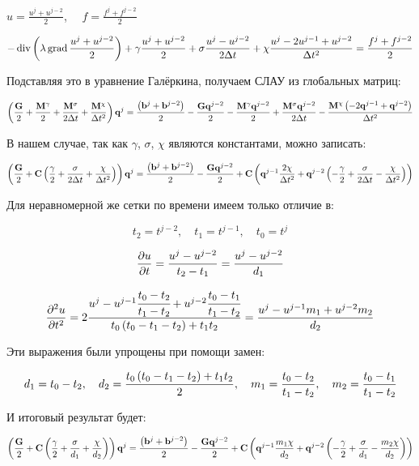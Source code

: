 \begin{center}
$\displaystyle u = \frac{u^j+u^{j-2}}{2} $, $\displaystyle \quad f = \frac{f^j+f^{j-2}}{2} $
\end{center}

\begin{center}
$\displaystyle -\operatorname{div}\left(\lambda \operatorname{grad}\frac{u^j+u^{j-2}}{2}\right) + \gamma \frac{u^j+u^{j-2}}{2} + \sigma \frac{u^j - u^{j-2}}{2\Delta t} + \chi \frac{u^j-2u^{j-1}+u^{j-2}}{\Delta t^2} = \frac{f^j+f^{j-2}}{2} $
\end{center}

Подставляя это в уравнение Галёркина, получаем СЛАУ из глобальных матриц:

$$ \left(\frac{\mathbf{G}}{2} + \frac{\mathbf{M}^\gamma}{2} + \frac{\mathbf{M}^\sigma}{2\Delta t} + \frac{\mathbf{M}^\chi}{\Delta t^2}\right)\mathbf{q}^j = \frac{\left(\mathbf{b}^j+\mathbf{b}^{j-2}\right)}{2} - \frac{\mathbf{G}\mathbf{q}^{j-2}}{2} - \frac{\mathbf{M}^\gamma\mathbf{q}^{j-2}}{2} + \frac{\mathbf{M}^\sigma \mathbf{q}^{j-2}}{2\Delta t} - \frac{\mathbf{M}^\chi \left(-2\mathbf{q}^{j-1} + \mathbf{q}^{j-2}\right)}{\Delta t^2} $$

В нашем случае, так как $\gamma$, $\sigma$, $\chi$ являются константами, можно записать:

$$ \left(\frac{\mathbf{G}}{2} + \mathbf{C}\left(\frac{\gamma}{2} + \frac{\sigma}{2\Delta t} + \frac{\chi}{\Delta t^2}\right)\right)\mathbf{q}^j = \frac{\left(\mathbf{b}^j+\mathbf{b}^{j-2}\right)}{2} - \frac{\mathbf{G}\mathbf{q}^{j-2}}{2} + \mathbf{C}\left(\mathbf{q}^{j-1}\frac{2\chi}{\Delta t^2} + \mathbf{q}^{j-2}\left(-\frac{\gamma}{2}+\frac{\sigma}{2\Delta t}-\frac{\chi}{\Delta t^2}\right)\right) $$

Для неравномерной же сетки по времени имеем только отличие в:

$$ t_2 = t^{j-2},\quad t_1 = t^{j-1},\quad t_0 = t^j $$

$$ \frac{\partial u}{\partial t} = \frac{u^j-u^{j-2}}{t_2-t_1} = \frac{u^j-u^{j-2}}{d_1} $$

$$ \frac{\partial^{2} u}{\partial t^{2}} = 2\frac{u^j-u^{j-1}\cfrac{t_0-t_2}{t_1-t_2}+u^{j-2}\cfrac{t_0-t_1}{t_1-t_2}}{t_0\left(t_0-t_1-t_2\right) + t_1 t_2} = \frac{u^j-u^{j-1}m_1+u^{j-2}m_2}{d_2} $$

Эти выражения были упрощены при помощи замен:

$$ d_1 = t_0-t_2, \quad d_2 = \frac{t_0\left(t_0-t_1-t_2\right) + t_1 t_2}{2}, \quad m_1 = \frac{t_0-t_2}{t_1-t_2}, \quad m_2 = \frac{t_0-t_1}{t_1-t_2} $$ 

И итоговый результат будет:

$$ \left(\frac{\mathbf{G}}{2} + \mathbf{C}\left(\frac{\gamma}{2} + \frac{\sigma}{d_1} + \frac{\chi}{d_2}\right)\right)\mathbf{q}^j = \frac{\left(\mathbf{b}^j+\mathbf{b}^{j-2}\right)}{2} - \frac{\mathbf{G}\mathbf{q}^{j-2}}{2} + \mathbf{C}\left(\mathbf{q}^{j-1}\frac{m_1\chi}{d_2} + \mathbf{q}^{j-2}\left(-\frac{\gamma}{2}+\frac{\sigma}{d_1}-\frac{m_2\chi}{d_2}\right)\right) $$

